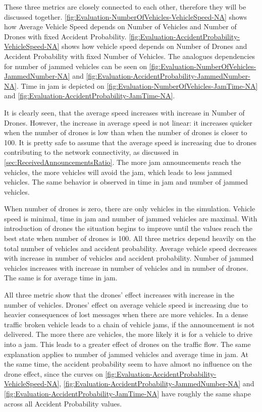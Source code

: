 \documentclass[]{nsm-thesis}
\begin{document}
These three metrics are closely connected to each other, therefore they will be discussed together. \cref{fig:Evaluation-NumberOfVehicles-VehicleSpeed-NA} shows how Average Vehicle Speed depends on Number of Vehicles and Number of Drones with fixed Accident Probability. \cref{fig:Evaluation-AccidentProbability-VehicleSpeed-NA} shows how vehicle speed depends on Number of Drones and Accident Probability with fixed Number of Vehicles. The analogues dependencies for number of jammed vehicles can be seen on \cref{fig:Evaluation-NumberOfVehicles-JammedNumber-NA} and \cref{fig:Evaluation-AccidentProbability-JammedNumber-NA}. Time in jam is depicted on \cref{fig:Evaluation-NumberOfVehicles-JamTime-NA} and \cref{fig:Evaluation-AccidentProbability-JamTime-NA}.

It is clearly seen, that the average speed increases with increase in Number of Drones. However, the increase in average speed is not linear: it increases quicker when the number of drones is low than when the number of drones is closer to 100. It is pretty safe to assume that the average speed is increasing due to drones contributing to the network connectivity, as discussed in \cref{sec:ReceivedAnnouncementsRatio}. The more jam announcements reach the vehicles, the more vehicles will avoid the jam, which leads to less jammed vehicles. The same behavior is observed in time in jam and number of jammed vehicles.

When number of drones is zero, there are only vehicles in the simulation. Vehicle speed is minimal, time in jam and number of jammed vehicles are maximal. With introduction of drones the situation begins to improve until the values reach the best state when number of drones is 100. All three metrics depend heavily on the total number of vehicles and accident probability. Average vehicle speed decreases with increase in number of vehicles and accident probability. Number of jammed vehicles increases with increase in number of vehicles and in number of drones. The same is for average time in jam.

All three metric show that the drones' effect increases with increase in the number of vehicles. Drones' effect on average vehicle speed is increasing due to heavier consequences of lost messages when there are more vehicles. In a dense traffic broken vehicle leads to a chain of vehicle jams, if the announcement is not delivered. The more there are vehicles, the more likely it is for a vehicle to drive into a jam. This leads to a greater effect of drones on the traffic flow. The same explanation applies to number of jammed vehicles and average time in jam. At the same time, the accident probability seem to have almost no influence on the drone effect, since the curves on \cref{fig:Evaluation-AccidentProbability-VehicleSpeed-NA}, \cref{fig:Evaluation-AccidentProbability-JammedNumber-NA} and \cref{fig:Evaluation-AccidentProbability-JamTime-NA} have roughly the same shape across all Accident Probability values.
\end{document}
